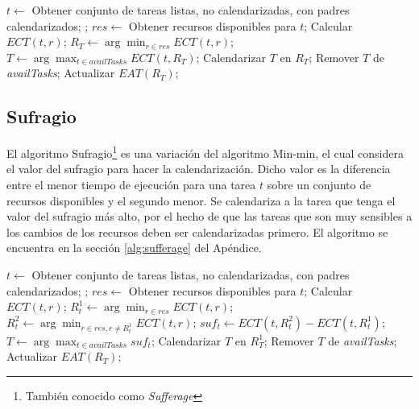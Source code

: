 \label{alg:max-min}
\begin{algorithmic}[1]
	\State $t \gets$ Obtener conjunto de tareas listas, no calendarizadas, con padres  calendarizados;
	\State {};
\EndWhile
{}
			\State $res \gets$ Obtener recursos disponibles para $t$;
				\State Calcular $ECT(t,r)$;
			\EndFor
			\State $R_T \gets \arg\min_{r \in res}ECT(t,r)$;
		\EndFor
		\State $T \gets \arg\max_{t \in availTasks}ECT(t,R_T)$;
		\State Calendarizar $T$ en $R_T$;
		\State Remover $T$ de \emph{availTasks};
		\State Actualizar $EAT(R_T)$;
	\EndWhile
\EndProcedure
\end{algorithmic}

\subsection{Sufragio}
El algoritmo Sufragio\footnote{También conocido como \emph{Sufferage}} \cite{maheswaran1999dynamic} es una variación del algoritmo Min-min, el cual considera el valor del sufragio para hacer la calendarización. Dicho valor es la diferencia entre el menor tiempo de ejecución para una tarea $t$ sobre un conjunto de recursos disponibles y el segundo menor. Se calendariza a la tarea que tenga el valor del sufragio más alto, por el hecho de que las tareas que son muy sensibles a los cambios de los recursos deben ser calendarizadas primero. El algoritmo se encuentra en la sección \ref{alg:sufferage} del Apéndice.

\label{alg:sufferage}
\begin{algorithmic}[1]
	\State $t \gets$ Obtener conjunto de tareas listas, no calendarizadas, con padres  calendarizados;
	\State {};
\EndWhile
{}
			\State $res \gets$ Obtener recursos disponibles para $t$;
				\State Calcular $ECT(t,r)$;
			\EndFor
			\State $R^1_t \gets \arg\min_{r \in res}ECT(t,r)$;
			\State $R^2_t \gets \arg\min_{r \in res, r \ne{R^1_t}}ECT(t,r)$;
			\State $suf_t \gets ECT(t,R^2_t) - ECT(t,R^1_t)$;
		\EndFor
		\State $T \gets \arg\max_{t \in availTasks}suf_t$;
		\State Calendarizar $T$ en $R^1_T$;
		\State Remover $T$ de \emph{availTasks};
		\State Actualizar $EAT(R_T)$;
	\EndWhile
\EndProcedure
\end{algorithmic}

